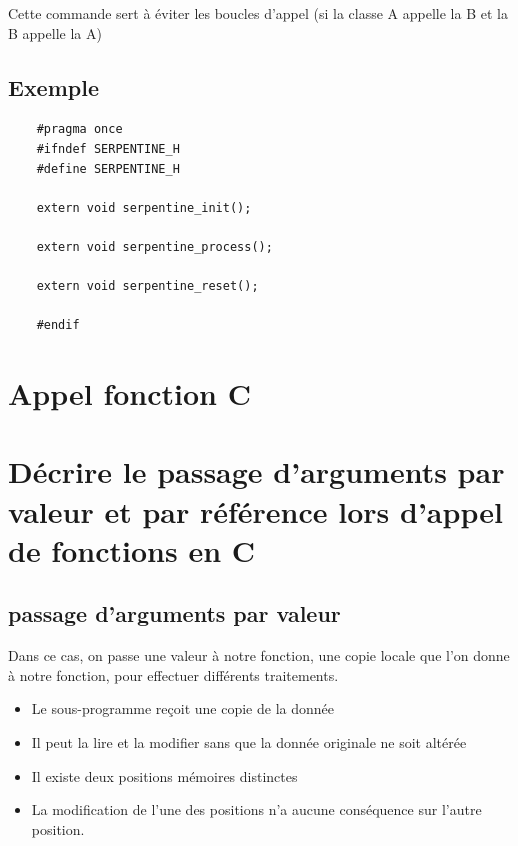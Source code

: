 Cette commande sert à éviter les boucles d'appel (si la classe A appelle la B et la B appelle la A)
\subsection{Exemple}
\begin{lstlisting}
    #pragma once
    #ifndef SERPENTINE_H
    #define SERPENTINE_H
    
    extern void serpentine_init();
    
    extern void serpentine_process();
    
    extern void serpentine_reset();
    
    #endif
\end{lstlisting}




\section{Appel fonction C}








\section{Décrire le passage d’arguments par valeur et par référence lors d’appel de
fonctions en C}

\subsection{passage d'arguments par valeur}

Dans ce cas, on passe une valeur à notre fonction, une copie locale que l'on donne à notre fonction, pour effectuer différents traitements.

\begin{itemize}
    \item Le sous-programme reçoit une copie de la donnée
    \item Il peut la lire et la modifier sans que la donnée originale ne soit altérée
    \item Il existe deux positions mémoires distinctes
    \item La modification de l'une des positions n'a aucune conséquence sur l'autre position.   
\end{itemize}

